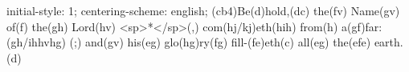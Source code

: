 initial-style: 1;
centering-scheme: english;
(cb4)Be(d)hold,(dc) the(fv) Name(gv) of(f) the(gh) Lord(hv) <sp>*</sp>(,) com(hj/kj)eth(hih) from(h) a(gf)far:(gh/ihhvhg) (;) and(gv) his(eg) glo(hg)ry(fg) fill-(fe)eth(c) all(eg) the(efe) earth.(d)
